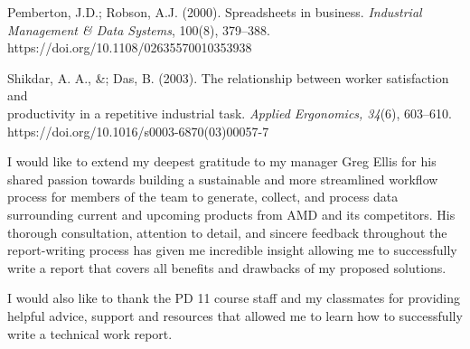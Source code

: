 \documentclass[12pt]{article}
\begin{document}
\newpage
Pemberton, J.D.; Robson, A.J. (2000). Spreadsheets in business. \emph{Industrial Management \& \indent\hspace{0.5in}  Data Systems}, 100(8), 379–388. \\ 
\indent\hspace{0.5in}  https://doi.org/10.1108/02635570010353938 

Shikdar, A. A., \&; Das, B. (2003). The relationship between worker satisfaction and \\
\indent\hspace{0.5in} productivity in a repetitive industrial task. \emph{Applied Ergonomics, 34}(6), 603–610. \\ 
\indent\hspace{0.5in} https://doi.org/10.1016/s0003-6870(03)00057-7 





\indent\hspace{0.5in} I would like to extend my deepest gratitude to my manager Greg Ellis for his shared passion towards building a sustainable and more streamlined workflow process for members of the team to generate, collect, and process data surrounding current and upcoming products from AMD and its competitors. His thorough consultation, attention to detail, and sincere feedback throughout the report-writing process has given me incredible insight allowing me to successfully write a report that covers all benefits and drawbacks of my proposed solutions.

\indent\hspace{0.5in} I would also like to thank the PD 11 course staff and my classmates for providing helpful advice, support and resources that allowed me to learn how to successfully write a technical work report.
\end{document}
